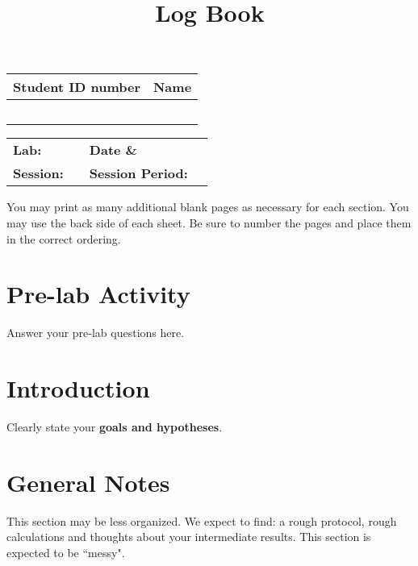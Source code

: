\documentclass[12pt]{article}
\title{Log Book}
\date{}
\begin{document}
\maketitle

\begin{table}[h]
\begin{tabular}{c | c}
Student ID number & Name \hspace{6cm} \\ \hline
\hspace{4cm} & \\
\hspace{4cm} & \\
\hspace{4cm} & \\
\hspace{4cm} & \\
\hspace{4cm} & \\
\end{tabular}
\end{table}

\begin{table}[h]
\begin{tabular}{l c l c}
\textbf{Lab:} & \hspace{6.5cm} & \textbf{Date \&} & \\
\textbf{Session:} & & \textbf{Session Period:} & 
\end{tabular}
\end{table}

\noindent You may print as many additional blank pages as necessary for each section.
You may use the back side of each sheet.	
Be sure to number the pages and place them in the correct ordering.

\section{Pre-lab Activity}
Answer your pre-lab questions here.
\newpage 

\section{Introduction}
Clearly state your \textbf{goals and hypotheses}.
\newpage

\section{General Notes}
This section may be less organized. We expect to find: a rough protocol, rough calculations
and thoughts about your intermediate results.
This section is expected to be ``messy".
\newpage
\end{document}
